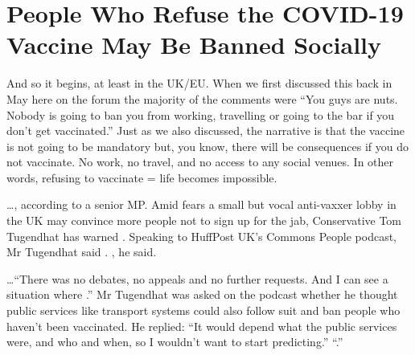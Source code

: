 \chapter{People Who Refuse the COVID-19 Vaccine May Be Banned Socially}

\begin{refsection}

And so it begins, at least in the UK/EU. When we first discussed this back in May here on the forum the majority of the comments were \enquote{You guys are nuts. Nobody is going to ban you from working, travelling or going to the bar if you don't get vaccinated.} Just as we also discussed, the narrative is that the vaccine is not going to be mandatory but, you know, there will be consequences if you do not vaccinate. No work, no travel, and no access to any social venues. In other words, refusing to vaccinate = life becomes impossible.

\begin{tcolorbox}[quote]

\dots{}, according to a senior MP. Amid fears a small but vocal anti-vaxxer lobby in the UK may convince more people not to sign up for the jab, Conservative Tom Tugendhat has warned . Speaking to HuffPost UK's Commons People podcast, Mr Tugendhat said . , he said.\textsuperscript{\cite{urlc8f72595}}

\end{tcolorbox}

\begin{tcolorbox}[quote]

\dots{}\enquote{There was no debates, no appeals and no further requests. And I can see a situation where .} Mr Tugendhat was asked on the podcast whether he thought public services like transport systems could also follow suit and ban people who haven't been vaccinated. He replied: \enquote{It would depend what the public services were, and who and when, so I wouldn't want to start predicting.} \enquote{.}\textsuperscript{\cite{urlc8f72595}}

\end{tcolorbox}

\printbibliography[heading=subbibliography]

\end{refsection}